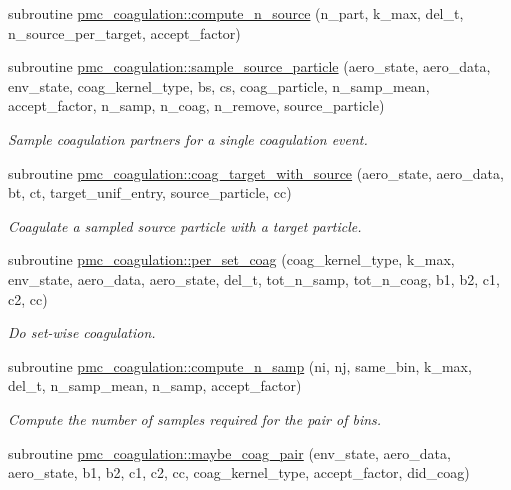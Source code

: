 \begin{DoxyCompactItemize}
subroutine \mbox{\hyperlink{namespacepmc__coagulation_a361de1ab6f07eedb1d66633ba50f3e49}{pmc\+\_\+coagulation\+::compute\+\_\+n\+\_\+source}} (n\+\_\+part, k\+\_\+max, del\+\_\+t, n\+\_\+source\+\_\+per\+\_\+target, accept\+\_\+factor)
\item 
subroutine \mbox{\hyperlink{namespacepmc__coagulation_a52dee0e42bb931daaa05f47cf32bf064}{pmc\+\_\+coagulation\+::sample\+\_\+source\+\_\+particle}} (aero\+\_\+state, aero\+\_\+data, env\+\_\+state, coag\+\_\+kernel\+\_\+type, bs, cs, coag\+\_\+particle, n\+\_\+samp\+\_\+mean, accept\+\_\+factor, n\+\_\+samp, n\+\_\+coag, n\+\_\+remove, source\+\_\+particle)
\begin{DoxyCompactList}\small\item\em Sample coagulation partners for a single coagulation event. \end{DoxyCompactList}\item 
subroutine \mbox{\hyperlink{namespacepmc__coagulation_a838d22172600c264f9f656ef20310a90}{pmc\+\_\+coagulation\+::coag\+\_\+target\+\_\+with\+\_\+source}} (aero\+\_\+state, aero\+\_\+data, bt, ct, target\+\_\+unif\+\_\+entry, source\+\_\+particle, cc)
\begin{DoxyCompactList}\small\item\em Coagulate a sampled source particle with a target particle. \end{DoxyCompactList}\item 
subroutine \mbox{\hyperlink{namespacepmc__coagulation_aa26bb6dffadf371d0be17adc22ea653a}{pmc\+\_\+coagulation\+::per\+\_\+set\+\_\+coag}} (coag\+\_\+kernel\+\_\+type, k\+\_\+max, env\+\_\+state, aero\+\_\+data, aero\+\_\+state, del\+\_\+t, tot\+\_\+n\+\_\+samp, tot\+\_\+n\+\_\+coag, b1, b2, c1, c2, cc)
\begin{DoxyCompactList}\small\item\em Do set-\/wise coagulation. \end{DoxyCompactList}\item 
subroutine \mbox{\hyperlink{namespacepmc__coagulation_a8df6a73ea4a7e7bedd8b12bf59420628}{pmc\+\_\+coagulation\+::compute\+\_\+n\+\_\+samp}} (ni, nj, same\+\_\+bin, k\+\_\+max, del\+\_\+t, n\+\_\+samp\+\_\+mean, n\+\_\+samp, accept\+\_\+factor)
\begin{DoxyCompactList}\small\item\em Compute the number of samples required for the pair of bins. \end{DoxyCompactList}\item 
subroutine \mbox{\hyperlink{namespacepmc__coagulation_a25340bbe4cbc91edfe95036aa4732cbb}{pmc\+\_\+coagulation\+::maybe\+\_\+coag\+\_\+pair}} (env\+\_\+state, aero\+\_\+data, aero\+\_\+state, b1, b2, c1, c2, cc, coag\+\_\+kernel\+\_\+type, accept\+\_\+factor, did\+\_\+coag)

\end{DoxyCompactItemize}
